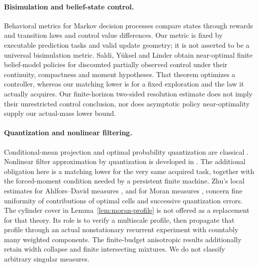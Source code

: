 \paragraph{Bisimulation and belief-state control.}
Behavioral metrics for Markov decision processes \cite{ferns} compare states through rewards and transition laws and control value differences. Our metric is fixed by executable prediction tasks and valid update geometry; it is not asserted to be a universal bisimulation metric. Saldi, Y\"uksel and Linder \cite[Assumption 1 and Theorem 3]{saldi} obtain near-optimal finite belief-model policies for discounted partially observed control under their continuity, compactness and moment hypotheses. That theorem optimizes a controller, whereas our matching lower is for a fixed exploration and the law it actually acquires. Our finite-horizon two-sided resolution estimate does not imply their unrestricted control conclusion, nor does asymptotic policy near-optimality supply our actual-mass lower bound.

\paragraph{Quantization and nonlinear filtering.}
Conditional-mean projection and optimal probability quantization are classical \cite{graf}. Nonlinear filter approximation by quantization is developed in \cite{pages,sellami,feuer}. The additional obligation here is a matching lower for the very same acquired task, together with the forced-moment condition needed by a persistent finite machine. Zhu's local estimates for Ahlfors--David measures \cite{zhu}, and for Moran measures \cite{zhu-moran}, concern fine uniformity of contributions of optimal cells and successive quantization errors. The cylinder cover in Lemma~\ref{lem:moran-profile} is not offered as a replacement for that theory. Its role is to verify a multiscale profile, then propagate that profile through an actual nonstationary recurrent experiment with countably many weighted components. The finite-budget anisotropic results additionally retain width collapse and finite intersecting mixtures. We do not classify arbitrary singular measures.

